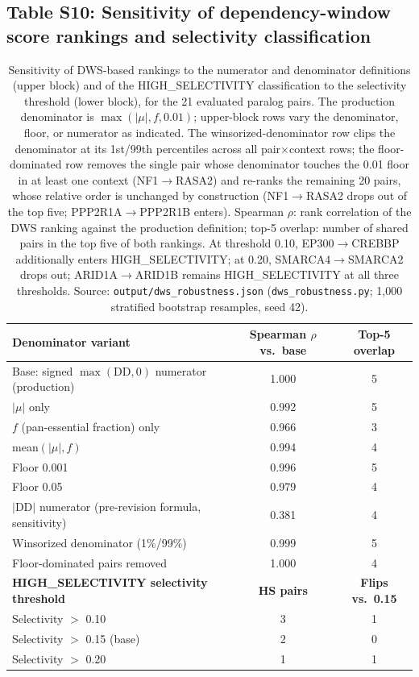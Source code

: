 \documentclass[11pt,a4paper]{article}
\begin{document}
\subsection{Table S10: Sensitivity of dependency-window score rankings and selectivity classification}
\begin{table}[H]
\centering
\footnotesize
\begin{tabular}{lcc}
\toprule
\textbf{Denominator variant} & \textbf{Spearman $\rho$ vs.\ base} & \textbf{Top-5 overlap} \\
\midrule
Base: signed $\max(\mathrm{DD},0)$ numerator (production) & 1.000 & 5 \\
$|\mu|$ only & 0.992 & 5 \\
$f$ (pan-essential fraction) only & 0.966 & 3 \\
mean$(|\mu|, f)$ & 0.994 & 4 \\
Floor 0.001 & 0.996 & 5 \\
Floor 0.05 & 0.979 & 4 \\
$|$DD$|$ numerator (pre-revision formula, sensitivity) & 0.381 & 4 \\
Winsorized denominator (1\%/99\%) & 0.999 & 5 \\
Floor-dominated pairs removed & 1.000 & 4 \\
\midrule
\textbf{HIGH\_SELECTIVITY selectivity threshold} & \textbf{HS pairs} & \textbf{Flips vs.\ 0.15} \\
\midrule
Selectivity $>$ 0.10 & 3 & 1 \\
Selectivity $>$ 0.15 (base) & 2 & 0 \\
Selectivity $>$ 0.20 & 1 & 1 \\
\bottomrule
\end{tabular}
\caption{Sensitivity of DWS-based rankings to the numerator and denominator definitions (upper block) and of the HIGH\_SELECTIVITY classification to the selectivity threshold (lower block), for the 21 evaluated paralog pairs. The production denominator is $\max(|\mu|, f, 0.01)$; upper-block rows vary the denominator, floor, or numerator as indicated. The winsorized-denominator row clips the denominator at its 1st/99th percentiles across all pair$\times$context rows; the floor-dominated row removes the single pair whose denominator touches the 0.01 floor in at least one context (NF1$\rightarrow$RASA2) and re-ranks the remaining 20 pairs, whose relative order is unchanged by construction (NF1$\rightarrow$RASA2 drops out of the top five; PPP2R1A$\rightarrow$PPP2R1B enters). Spearman $\rho$: rank correlation of the DWS ranking against the production definition; top-5 overlap: number of shared pairs in the top five of both rankings. At threshold 0.10, EP300$\rightarrow$CREBBP additionally enters HIGH\_SELECTIVITY; at 0.20, SMARCA4$\rightarrow$SMARCA2 drops out; ARID1A$\rightarrow$ARID1B remains HIGH\_SELECTIVITY at all three thresholds. Source: \texttt{output/dws\_robustness.json} (\texttt{dws\_robustness.py}; 1{,}000 stratified bootstrap resamples, seed 42).}
\end{table}
\end{document}
